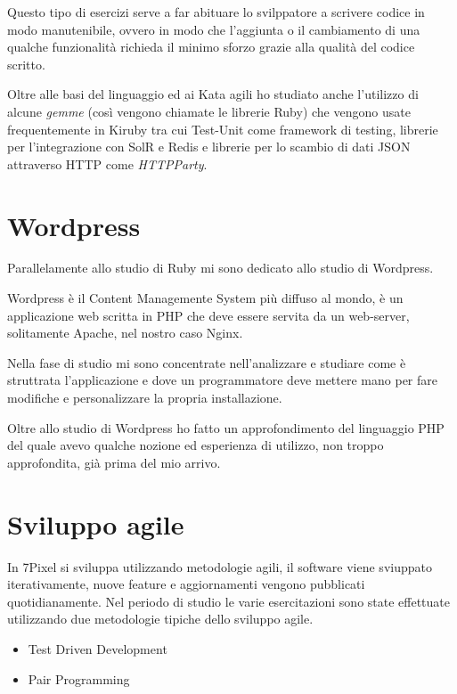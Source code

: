 Questo tipo di esercizi serve a far abituare
lo svilppatore a scrivere codice in modo manutenibile, ovvero in modo che l'aggiunta o il cambiamento di una qualche 
funzionalità richieda il minimo sforzo grazie alla qualità del codice scritto.

Oltre alle basi del linguaggio ed ai Kata agili ho studiato anche l'utilizzo di alcune \emph{gemme} (così vengono chiamate le 
librerie Ruby) che vengono
usate frequentemente in Kiruby tra cui Test-Unit come framework di testing, librerie per l'integrazione
con SolR e Redis e librerie per lo scambio di dati JSON attraverso HTTP come \emph{HTTPParty}.

\section{Wordpress}

Parallelamente allo studio di Ruby mi sono dedicato allo studio di Wordpress.

Wordpress è il Content Managemente System più diffuso al mondo, è un applicazione web scritta in PHP
che deve essere servita da un web-server, solitamente Apache, nel nostro caso Nginx.

Nella fase di studio mi sono concentrate nell'analizzare e studiare come è struttrata l'applicazione
e dove un programmatore deve mettere mano per fare modifiche e personalizzare la propria installazione.

Oltre allo studio di Wordpress ho fatto un approfondimento del linguaggio PHP del quale avevo qualche
nozione ed esperienza di utilizzo, non troppo approfondita, già prima del mio arrivo. 





\section{Sviluppo agile}

In 7Pixel si sviluppa utilizzando metodologie agili, il software viene sviuppato
iterativamente, nuove feature e aggiornamenti vengono pubblicati quotidianamente.
Nel periodo di studio le varie esercitazioni sono state effettuate
utilizzando due metodologie tipiche dello sviluppo agile.

\begin{itemize}
\item Test Driven Development
\item Pair Programming
\end{itemize}

